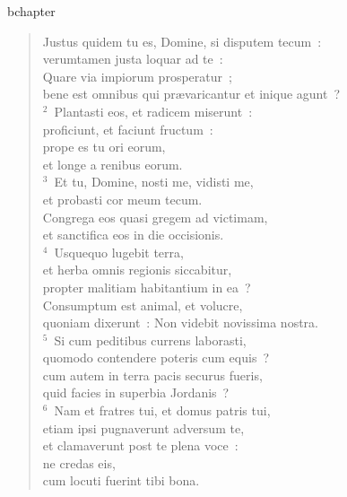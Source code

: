 bchapter\begin{verse}\vspace{-19pt}Justus quidem tu es, Domine, si disputem tecum~:\\ verumtamen justa loquar ad te~:\\ Quare via impiorum prosperatur~;\\ bene est omnibus qui pr\ae varicantur et inique agunt~?\\
${}^{2}$~Plantasti eos, et radicem miserunt~:\\ proficiunt, et faciunt fructum~:\\ prope es tu ori eorum,\\ et longe a renibus eorum.\\
${}^{3}$~Et tu, Domine, nosti me, vidisti me,\\ et probasti cor meum tecum.\\ Congrega eos quasi gregem ad victimam,\\ et sanctifica eos in die occisionis.\\
${}^{4}$~Usquequo lugebit terra,\\ et herba omnis regionis siccabitur,\\ propter malitiam habitantium in ea~?\\ Consumptum est animal, et volucre,\\ quoniam dixerunt~: Non videbit novissima nostra.\\
${}^{5}$~Si cum peditibus currens laborasti,\\ quomodo contendere poteris cum equis~?\\ cum autem in terra pacis securus fueris,\\ quid facies in superbia Jordanis~?\\
${}^{6}$~Nam et fratres tui, et domus patris tui,\\ etiam ipsi pugnaverunt adversum te,\\ et clamaverunt post te plena voce~:\\ ne credas eis,\\ cum locuti fuerint tibi bona.\end{verse}


